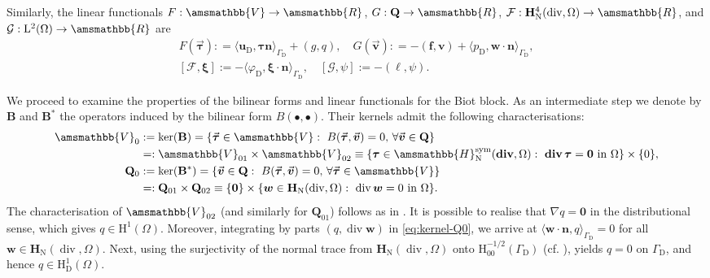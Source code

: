 \documentclass[fleqn,a4paper]{cas-sc}
\newcommand\cero{\boldsymbol{0}}
\newcommand\vdiv{\mathop{\mathrm{div}}\nolimits}
\newcommand\bdiv{\mathop{\mathbf{div}}\nolimits}
\newcommand{\bB}{\mathbf{B}}
\newcommand{\bbR}{\amsmathbb{R}}
\newcommand\RR{\bbR}
\newcommand{\bu}{\boldsymbol{u}}
\newcommand{\bn}{\boldsymbol{n}}
\newcommand{\bv}{\boldsymbol{v}}
\newcommand{\bw}{\boldsymbol{w}}
\newcommand{\ff}{\boldsymbol{f}}
\newcommand{\bxi}{\boldsymbol{\xi}}
\newcommand{\0}{\boldsymbol{0}}
\newcommand\cG{\mathcal{G}}
\newcommand\cF{\mathcal{F}}
\newcommand\bQ{\mathbf{Q}}
\newcommand\rH{\mathrm{H}}
\newcommand\bbV{\amsmathbb{V}}
\newcommand\bbH{\amsmathbb{H}}
\newcommand\bH{\mathbf{H}}
\newcommand\rL{\mathrm{L}}
\newcommand\btau{\boldsymbol{\tau}}
\numberwithin{equation}{section}
\numberwithin{figure}{section}
\begin{document}
Similarly, the linear functionals $F: \bbV\to \RR$, $G: \bQ\to\RR$, $\cF: \bH_{\mathrm{N}}^{4}(\vdiv,\Omega)\to \RR$, and $\cG: \rL^2(\Omega)\to \RR$ are 
\begin{gather*} F(\vec{\btau}) : = \langle \bu_{\mathrm{D}},\btau\bn\rangle_{\Gamma_{\mathrm{D}}} + (g,q), \quad G(\vec{\bv}): = - (\ff,\bv) + \langle p_{\mathrm{D}},\bw\cdot\bn\rangle_{\Gamma_{\mathrm{D}}}, \\
[\cF,\bxi]:= - \langle \varphi_{\mathrm{D}},\bxi\cdot\bn\rangle_{\Gamma_{\mathrm{D}}}, \quad 
[\cG,\psi]:= -(\ell,\psi).
\end{gather*}

We proceed to examine the properties of the bilinear forms and linear functionals for the Biot block. As an intermediate step we denote by $\bB$ and $\bB^*$ the operators induced by the bilinear form $B(\bullet,\bullet)$. Their kernels admit the following characterisations:
\begin{subequations}\label{eq:kernel-V0}
\begin{align}
\bbV_0 &:= \mathrm{ker}(\bB) = \{ \vec{\btau} \in \bbV: \ B(\vec{\btau},\vec{\bv}) = 0 ,\, \forall \vec{\bv}\in \bQ\} \notag \\
&=: \bbV_{01} \times \bbV_{02} \equiv \{ \btau \in \bbH^{\mathrm{sym}}_{\mathrm{N}}(\bdiv,\Omega): \ \bdiv\btau = \cero \ \text{in}\ \Omega\} \times \{0\},\\
\bQ_0 &:= \mathrm{ker}(\bB^*) = \{ \vec{\bv} \in \bQ: \ B(\vec{\btau},\vec{\bv}) = 0 ,\, \forall \vec{\btau}\in \bbV\} \notag \\
&=: \bQ_{01} \times \bQ_{02} \equiv \{\cero\}\times \{ \bw \in \bH_{\mathrm{N}}(\vdiv,\Omega): \ \vdiv\bw = 0 \ \text{in}\ \Omega\}. \label{eq:kernel-Q0}
\end{align}
\end{subequations}
 The characterisation of $\bbV_{02}$ (and similarly for $\bQ_{01}$) follows as in \cite[Section 3.3]{cgm-M2AN-2020}. It is possible to realise that $\nabla q =\cero$ in the distributional sense, which gives $q \in \rH^{1}_{}(\Omega)$. Moreover, integrating by parts $(q, \vdiv \bw)$ in \eqref{eq:kernel-Q0}, we arrive at $\langle \bw \cdot \bn, q\rangle_{\Gamma_{\mathrm{D}}} = 0$  for all $\bw \in \bH_{\mathrm{N}}(\vdiv,\Omega)$. Next, using the surjectivity of the normal trace from $\bH_{\mathrm{N}}(\vdiv,\Omega)$ onto $\rH^{-1/2}_{00}(\Gamma_{\mathrm{D}})$ (cf. \cite[Lemma 51.5]{guermond2021feII}), yields $q=0$ on $\Gamma_{\mathrm{D}}$, and hence $q \in \rH^{1}_{\mathrm{D}}(\Omega)$.
\end{document}
